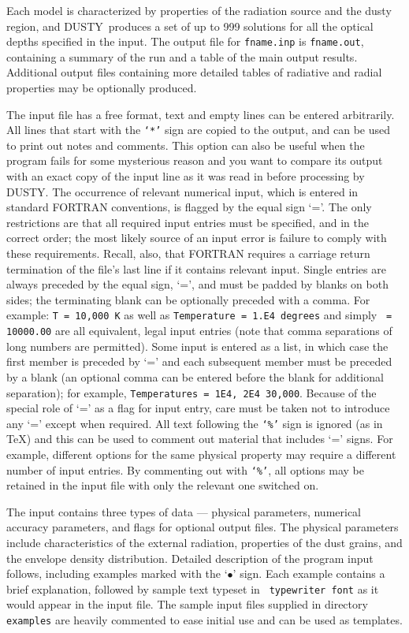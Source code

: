 \documentclass[11pt]{article}
\def\D    {{\sf DUSTY}}
\begin{document}
Each model is characterized by properties of the radiation source and
the dusty region, and \D\ produces a set of up to 999 solutions for
all the optical depths specified in the input.  The output file for
{\tt fname.inp} is {\tt fname.out}, containing a summary of the run
and a table of the main output results. Additional output files
containing more detailed tables of radiative and radial properties may
be optionally produced.

The input file has a free format, text and empty lines can be entered
arbitrarily. All lines that start with the {\tt `*'} sign are copied
to the output, and can be used to print out notes and comments. This
option can also be useful when the program fails for some mysterious
reason and you want to compare its output with an exact copy of the
input line as it was read in before processing by \D. The occurrence
of relevant numerical input, which is entered in standard FORTRAN
conventions, is flagged by the equal sign `='. The only restrictions
are that all required input entries must be specified, and in the
correct order; the most likely source of an input error is failure to
comply with these requirements.  Recall, also, that FORTRAN requires a
carriage return termination of the file's last line if it contains
relevant input. Single entries are always preceded by the equal sign,
`=', and must be padded by blanks on both sides; the terminating blank
can be optionally preceded with a comma. For example: {\tt T = 10,000
  K} as well as {\tt Temperature = 1.E4 degrees} and simply {\tt {} =
  10000.00} are all equivalent, legal input entries (note that comma
separations of long numbers are permitted).  Some input is entered as
a list, in which case the first member is preceded by `=' and each
subsequent member must be preceded by a blank (an optional comma can
be entered before the blank for additional separation); for example,
{\tt Temperatures = 1E4, 2E4 30,000}. Because of the special role of
`=' as a flag for input entry, care must be taken not to introduce any
`=' except when required.  All text following the {\tt `\%'} sign is
ignored (as in \TeX) and this can be used to comment out material that
includes `=' signs.  For example, different options for the same
physical property may require a different number of input entries. By
commenting out with {\tt `\%'}, all options may be retained in the
input file with only the relevant one switched on.

The input contains three types of data --- physical parameters,
numerical accuracy parameters, and flags for optional output files.
The physical parameters include characteristics of the external
radiation, properties of the dust grains, and the envelope density
distribution.  Detailed description of the program input follows,
including examples marked with the `$\bullet$' sign. Each example
contains a brief explanation, followed by sample text typeset in {\tt
  typewriter font} as it would appear in the input file. The sample
input files supplied in directory {\tt examples} are heavily commented
to ease initial use and can be used as templates.
\end{document}
